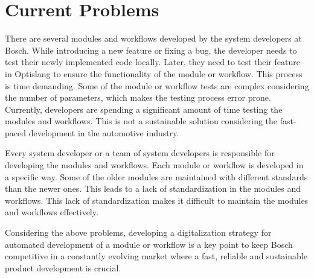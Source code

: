 \section{Current Problems} \label{current problem}
There are several modules and workflows developed by the system developers at Bosch. While introducing a new feature or fixing a bug, the developer needs to test their
newly implemented code locally. Later, they need to test their feature in Optislang to ensure the functionality of the module or workflow. This process is 
time demanding. Some of the module or workflow tests are complex considering the number of parameters, which makes the testing process error prone. Currently, 
developers are spending a significant amount of time testing the modules and workflows. This is not a sustainable solution considering the fast-paced development in the automotive industry.

Every system developer or a team of system developers is responsible for developing the modules and workflows. Each module or workflow is developed in a 
specific way. Some of the older modules are maintained with different standards than the newer ones. This leads to a lack of standardization 
in the modules and workflows. This lack of standardization makes it difficult to maintain the modules and workflows 
effectively.\newline

Considering the above problems, developing a digitalization strategy for automated development of a module or workflow is a key point to keep Bosch competitive 
in a constantly evolving market where a fast, reliable and sustainable product development is crucial.